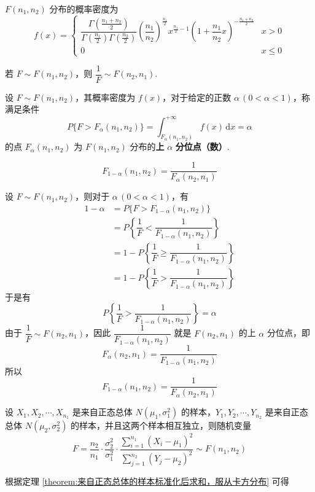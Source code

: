 $F(n_1, n_2)$ 分布的概率密度为
$$
f(x) = \begin{cases}
    \dfrac{\Gamma(\frac{n_1 + n_2}{2})}{\Gamma(\frac{n_1}{2}) \Gamma(\frac{n_2}{2})} \left( \dfrac{n_1}{n_2} \right)^{\frac{n_1}{2}} x^{\frac{n_1}{2} - 1} \left( 1 + \dfrac{n_1}{n_2} x \right)^{-\frac{n_1 + n_2}{2}} & x>0 \\[0.5em]
    0 & x \leqslant 0
\end{cases}
$$

若 $F \sim F(n_1, n_2)$，则 $\dfrac{1}{F} \sim F(n_2, n_1)$.

\begin{definition}
    设 $F \sim F(n_1, n_2)$，其概率密度为 $f(x)$，对于给定的正数 $\alpha \, (0 < \alpha < 1)$，称满足条件
    $$
    P \{ F > F_{\alpha}(n_1, n_2) \} = \int_{F_{\alpha}(n_1, n_2)}^{+\infty} f(x) \, \text{d}x = \alpha
    $$
    的点 $F_{\alpha}(n_1, n_2)$ 为 $F(n_1, n_2)$ 分布的\textbf{上} $\alpha$ \textbf{分位点（数）}.
\end{definition}

\setcounter{propertyname}{0}

\begin{property}
    $$
    F_{1 - \alpha}(n_1, n_2) = \dfrac{1}{F_{\alpha}(n_2, n_1)}
    $$
\end{property}

\begin{myproof}
    设 $F \sim F(n_1, n_2)$，则对于 $\alpha \, (0 < \alpha < 1)$，有
    $$
    \begin{aligned}
        1 - \alpha &= P \{ F > F_{1 - \alpha}(n_1, n_2) \} \\
        &= P \left\{ \dfrac{1}{F} < \dfrac{1}{F_{1 - \alpha}(n_1, n_2)} \right\} \\
        &= 1 - P \left\{ \dfrac{1}{F} \geqslant \dfrac{1}{F_{1 - \alpha}(n_1, n_2)} \right\} \\
        &= 1 - P \left\{ \dfrac{1}{F} > \dfrac{1}{F_{1 - \alpha}(n_1, n_2)} \right\}
    \end{aligned}
    $$
    于是有
    $$
    P \left\{ \dfrac{1}{F} > \dfrac{1}{F_{1 - \alpha}(n_1, n_2)} \right\} = \alpha
    $$
    由于 $\dfrac{1}{F} \sim F(n_2, n_1)$，因此 $\dfrac{1}{F_{1 - \alpha}(n_1, n_2)}$ 就是 $F(n_2, n_1)$ 的上 $\alpha$ 分位点，即
    $$
    F_{\alpha}(n_2, n_1) = \dfrac{1}{F_{1 - \alpha}(n_1, n_2)}
    $$
    所以
    $$
    F_{1 - \alpha}(n_1, n_2) = \dfrac{1}{F_{\alpha}(n_2, n_1)}
    $$
\end{myproof}

\begin{theorem}
    设 $X_1, X_2, \cdots, X_{n_1}$ 是来自正态总体 $N(\mu_1, \sigma_1^2)$ 的样本，$Y_1, Y_2, \cdots, Y_{n_2}$ 是来自正态总体 $N(\mu_2, \sigma_2^2)$ 的样本，并且这两个样本相互独立，则随机变量
    $$
    F = \dfrac{n_2}{n_1} \cdot \dfrac{\sigma_2^2}{\sigma_1^2} \cdot \dfrac{\displaystyle\sum_{i=1}^{n_1} (X_i - \mu_1)^2}{\displaystyle\sum_{j=1}^{n_2} (Y_j - \mu_2)^2} \sim F(n_1, n_2)
    $$
\end{theorem}

\begin{myproof}
    根据定理 \ref{theorem:来自正态总体的样本标准化后求和，服从卡方分布} 可得
\end{myproof}